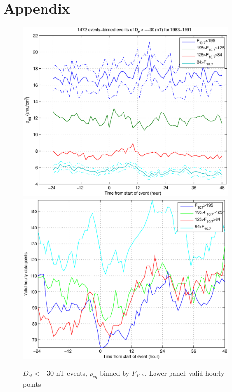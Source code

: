 \documentclass[10pt,twocolumn]{article}
\begin{document}
\section{Appendix}
\hfill
\begin{figure}[htp!]
\includegraphics[scale=0.45]{paperfigures/HighLowF107rhoeq-Dst30.eps}
\includegraphics[scale=0.45]{paperfigures/HighLowF107rhoeq-Dst30-valid.eps}
\caption{$D_{st} < -30$ nT events, $\rho_{eq}$ binned by $F_{10.7}$. Lower panel: valid hourly points}
\end{figure}
\hfill
\end{document}
